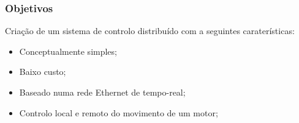 \begin{frame}
	\frametitle{Objetivos}
	Criaç\~{a}o de um sistema de controlo distribu\'{i}do com a seguintes carater\'{i}sticas:
	\begin{itemize}
		\item Conceptualmente simples;
		\item Baixo custo;
		\item Baseado numa rede Ethernet de tempo-real;
		\item Controlo local e remoto do movimento de um motor;
	\end{itemize}
\end{frame}
